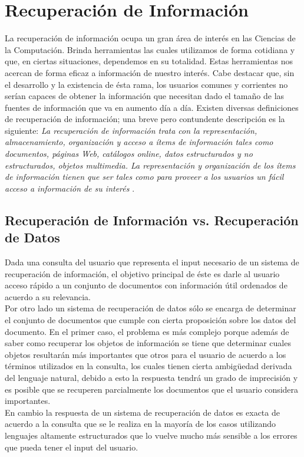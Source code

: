 \section{Recuperación de Información}
	La recuperación de información ocupa un gran área de interés en las Ciencias de la Computación. Brinda herramientas las cuales utilizamos de forma cotidiana y que, en ciertas situaciones, dependemos en su totalidad. Estas herramientas nos acercan de forma eficaz a información de nuestro interés. Cabe destacar que, sin el desarrollo y la existencia de ésta rama, los usuarios comunes y corrientes no serían capaces de obtener la información que necesitan dado el tamaño de las fuentes de información que va en aumento día a día. Existen diversas definiciones de recuperación de información; una breve pero contundente descripción es la siguiente: \textit{La recuperación de información trata con la representación, almacenamiento, organización y acceso a ítems de información tales como documentos, páginas Web, catálogos online, datos estructurados y no estructurados, objetos multimedia. La representación y organización de los ítems de información tienen que ser tales como para proveer a los usuarios un fácil acceso a información de su interés} \cite{baeza1999}.
	
	\subsection{Recuperación de Información vs. Recuperación de Datos}
	Dada una consulta del usuario que representa el input necesario de un sistema de recuperación de información, el objetivo principal de éste es darle al usuario acceso rápido a un conjunto de documentos con información útil ordenados de acuerdo a su relevancia.  \\
	Por otro lado un sistema de recuperación de datos sólo se encarga de determinar el conjunto de documentos que cumple con cierta proposición sobre los datos del documento.
	En el primer caso, el problema es más complejo porque además de saber como recuperar los objetos de información se tiene que determinar cuales objetos resultarán más importantes que otros para el usuario de acuerdo a los términos utilizados en la consulta, los cuales tienen cierta ambigüedad derivada del lenguaje natural, debido a esto la respuesta tendrá un grado de imprecisión y es posible que se recuperen parcialmente los documentos que el usuario considera importantes. \\
	En cambio la respuesta de un sistema de recuperación de datos es exacta de acuerdo a la consulta que se le realiza en la mayoría de los casos utilizando lenguajes altamente estructurados que lo vuelve mucho más sensible a los errores que pueda tener el input del usuario.
	

